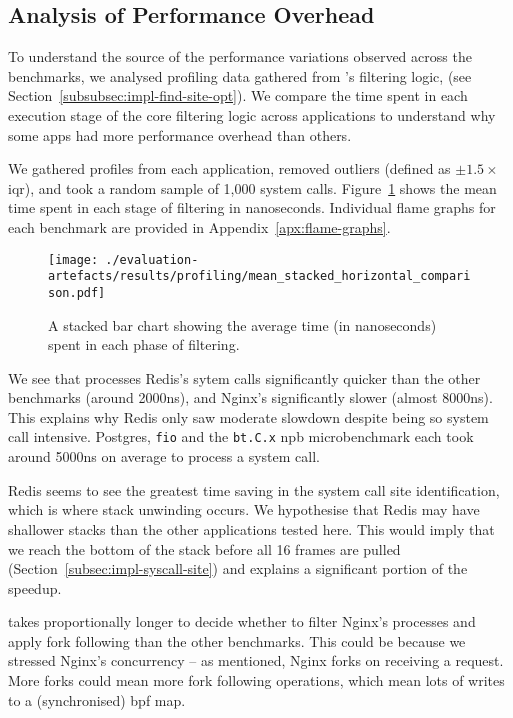 \subsection{Analysis of Performance Overhead}

To understand the source of the performance variations observed across the
benchmarks, we analysed profiling data gathered from \af's filtering logic,
(see Section~\ref{subsubsec:impl-find-site-opt}). We compare the time spent in
each execution stage of the core filtering logic across applications to
understand why some apps had more performance overhead than others.

We gathered profiles from each application, removed outliers (defined as
$\pm1.5\times$ \ac{iqr}), and took a random sample of 1,000 system calls. 
Figure~\ref{fig:profile-means} shows the mean time spent in each stage of
filtering in nanoseconds. Individual flame graphs for each benchmark are 
provided in Appendix~\ref{apx:flame-graphs}.

\begin{figure}[htbp]
    \centering
    \texttt{[image: ./evaluation-artefacts/results/profiling/mean\_stacked\_horizontal\_comparison.pdf]}
    \caption{A stacked bar chart showing the average time (in nanoseconds) \af
    spent in each phase of filtering.}
    \label{fig:profile-means}
\end{figure}

We see that \af processes Redis's sytem calls significantly quicker than the
other benchmarks (around 2000ns), and Nginx's significantly slower (almost
8000ns). This explains why Redis only saw moderate slowdown despite being so 
system call intensive. Postgres, \texttt{fio} and the \texttt{bt.C.x} \ac{npb}
microbenchmark each took around 5000ns on average to process a system call.

Redis seems to see the greatest time saving in the system call site
identification, which is where stack unwinding occurs. We hypothesise that Redis
may have shallower stacks than the other applications tested here. This would
imply that we reach the bottom of the stack before all 16 frames are pulled
(Section~\ref{subsec:impl-syscall-site}) and explains a significant portion of the 
speedup.

\af takes proportionally longer to decide whether to filter Nginx's processes
and apply fork following than the other benchmarks. This could be because we
stressed Nginx's concurrency -- as mentioned, Nginx forks on receiving a
request. More forks could mean more fork following operations, which mean lots
of writes to a (synchronised) \ac{bpf} map.


